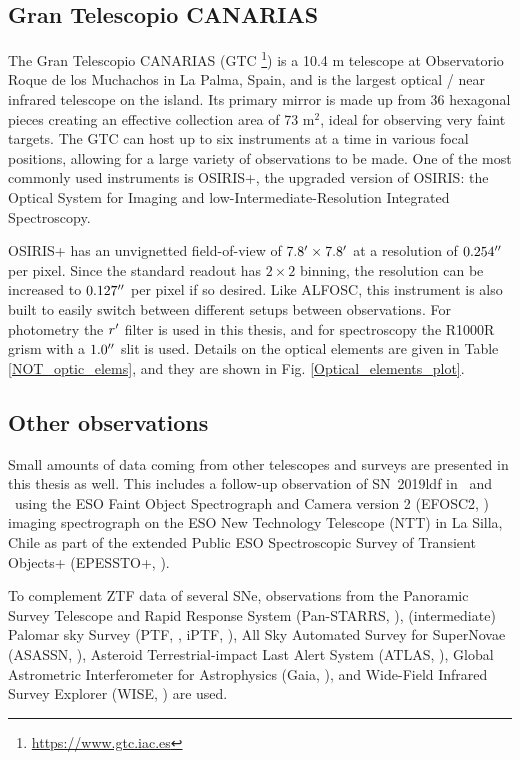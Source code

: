 \documentclass[a4paper,oneside,12pt, class=Latex/Classes/PhDthesisPSnPDF, crop=false]{standalone}
\begin{document}
\subsection{Gran Telescopio CANARIAS}
The Gran Telescopio CANARIAS (GTC \footnote{\url{https://www.gtc.iac.es}}) is a 10.4 m telescope at Observatorio Roque de los Muchachos in La Palma, Spain, and is the largest optical / near infrared telescope on the island. Its primary mirror is made up from 36 hexagonal pieces creating an effective collection area of 73 m$^2$, ideal for observing very faint targets. The GTC can host up to six instruments at a time in various focal positions, allowing for a large variety of observations to be made. One of the most commonly used instruments is OSIRIS+, the upgraded version of OSIRIS: the Optical System for Imaging and low-Intermediate-Resolution Integrated Spectroscopy.

OSIRIS+ has an unvignetted field-of-view of $7.8^{\prime}\times7.8^{\prime}$ at a resolution of $0.254^{\prime\prime}$ per pixel. Since the standard readout has $2\times2$ binning, the resolution can be increased to $0.127^{\prime\prime}$ per pixel if so desired. Like ALFOSC, this instrument is also built to easily switch between different setups between observations. For photometry the $r^{\prime}$ filter is used in this thesis, and for spectroscopy the R1000R grism with a $1.0^{\prime\prime}$ slit is used. Details on the optical elements are given in Table \ref{NOT_optic_elems}, and they are shown in Fig. \ref{Optical_elements_plot}.


\subsection{Other observations}
Small amounts of data coming from other telescopes and surveys are presented in this thesis as well. This includes a follow-up observation of SN~2019ldf in \ztfg\ and \ztfr\ using the ESO Faint Object Spectrograph and Camera version 2 (EFOSC2, \citealt{EFOSC2}) imaging spectrograph on the ESO New Technology Telescope (NTT) in La Silla, Chile as part of the extended Public ESO Spectroscopic Survey of Transient Objects+ (EPESSTO+, \citealt{PESSTO}).

To complement ZTF data of several SNe, observations from the Panoramic Survey Telescope and Rapid Response System (Pan-STARRS, \citealt{Pan-STARRS1}), (intermediate) Palomar sky Survey (PTF, \citealt{PTF_1, PTF_2}, iPTF, \citealt{iPTF}), All Sky Automated Survey for SuperNovae (ASASSN, \citealt{ASASSN_paper1, ASASSN_catalog}), Asteroid Terrestrial-impact Last Alert System (ATLAS, \citealt{ATLAS}),  Global Astrometric Interferometer for Astrophysics (Gaia, \citealt{Gaia}), and Wide-Field Infrared Survey Explorer (WISE, \citealt{WISE}) are used.
\end{document}
